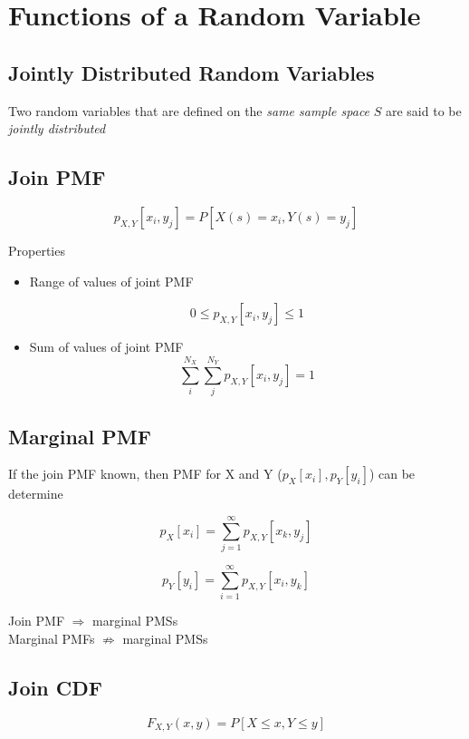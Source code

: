 \section{Functions of a Random Variable}
\subsection{Jointly Distributed Random Variables}
Two random variables that are defined on the \emph{same sample space} $S$ are said to be \emph{jointly distributed }

\subsection{Join PMF}

\begin{equation*}
	p_{X,Y}[x_{i},y_{j}]=P[X(s)=x_{i}, Y(s)=y_{j}]
\end{equation*}


Properties\\
\begin{itemize}
     \item Range of values of joint PMF

	\begin{equation*}
		0 \leq p_{X,Y}[x_{i},y_{j}] \leq  1
	\end{equation*}
     \item Sum of values of joint PMF
	\begin{equation*}
		\sum_{i}^{N_{X}} \sum_{j}^{N_{Y}} p_{X,Y}[x_{i},y_{j}]=1
	\end{equation*}
\end{itemize}

\subsection{Marginal PMF}

If the join PMF known, then PMF for X and Y ($p_{X}[x_{i}], p_{Y}[y_{i}]$) can be determine 

\begin{equation*}
	p_{X}[x_{i}]=\sum_{j=1}^{\infty} p_{X,Y}[x_{k},y_{j}]
\end{equation*}

\begin{equation*}
	p_{Y}[y_{i}]=\sum_{i=1}^{\infty} p_{X,Y}[x_{i},y_{k}]
\end{equation*}

\begin{center}
	{\color{blue}Join PMF $\Rightarrow$ marginal PMSs}\\
	{\color{red} Marginal PMFs $\not\Rightarrow$ marginal PMSs}
\end{center}



\subsection{Join CDF}
\begin{equation*}
	F_{X,Y}(x,y)=P[X\leq x, Y\leq y]	
\end{equation*}

\newpage
